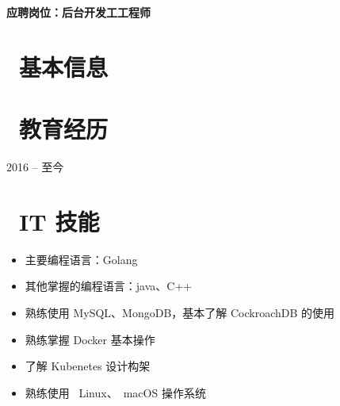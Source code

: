 \documentclass{resume}
\begin{document}

  \hfill \vspace{2mm} \par
\textbf{应聘岗位：后台开发⼯工程师}

\section{\faInfo\ 基本信息} \vspace{1mm}

{\phone {} \qquad\qquad\quad
\email {}
\vspace{2mm} \par
\github {} \qquad
\faLink {}}

\section{\faGraduationCap\ 教育经历} \vspace{1mm}

{2016 -- 至今}

\section{\faCogs\ IT 技能} \vspace{1mm}

\begin{itemize}[parsep=1ex]
  \item 主要编程语言：Golang
  \item 其他掌握的编程语言：java、C++
  \item 熟练使⽤ MySQL、MongoDB，基本了解 CockroachDB 的使用
  \item 熟练掌握 Docker 基本操作
  \item 了解 Kubenetes 设计构架
  \item 熟练使⽤ \faLinux\ {Linux}、\faApple\ {macOS} 操作系统
\end{itemize}
\end{document}
